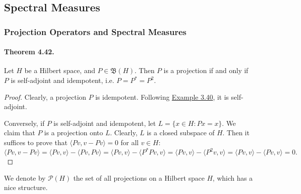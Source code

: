\documentclass{article}
\begin{document}
\subsection{Spectral Measures}
\subsubsection{Projection Operators and Spectral Measures}
\paragraph{Theorem 4.42.\label{thm:4.42}}  Let $H$ be a Hilbert space, and $P\in\mathfrak{B}(H)$. Then $P$ is a projection if and only if $P$ is self-adjoint and idempotent, i.e. $P=P^*=P^2$.
\begin{proof}
Clearly, a projection $P$ is idempotent. Following \hyperref[example:3.40]{Example 3.40}, it is self-adjoint.

Conversely, if $P$ is self-adjoint and idempotent, let $L=\{x\in H:Px=x\}$. We claim that $P$ is a projection onto $L$. Clearly, $L$ is a closed subspace of $H$. Then it suffices to prove that $\langle Pv,v-Pv\rangle=0$ for all $v\in H$:
$\langle Pv,v-Pv\rangle = \langle Pv,v\rangle - \langle Pv,Pv\rangle = \langle Pv,v\rangle - \langle P^*Pv,v\rangle = \langle Pv,v\rangle - \langle P^2v,v\rangle = \langle Pv,v\rangle - \langle Pv,v\rangle = 0.$
\end{proof}

We denote by $\mathcal{P}(H)$ the set of all projections on a Hilbert space $H$, which has a nice structure.
\end{document}
